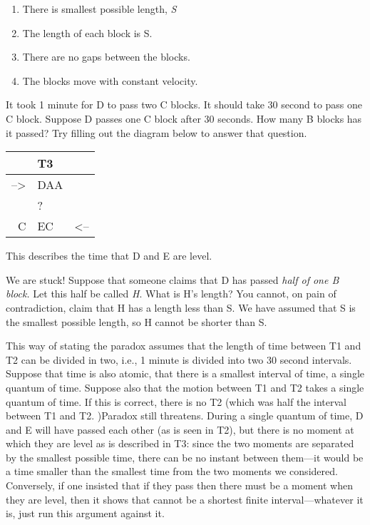 \documentclass[]{article}
\providecommand{\tightlist}{%
  \setlength{\itemsep}{0pt}\setlength{\parskip}{0pt}}
\begin{document}
\begin{enumerate}
\def\labelenumi{\arabic{enumi}.}
\tightlist
\item
  There is smallest possible length, \emph{S}
\item
  The length of each block is S.
\item
  There are no gaps between the blocks.
\item
  The blocks move with constant velocity.
\end{enumerate}

It took 1 minute for D to pass two C blocks. It should take 30 second to
pass one C block. Suppose D passes one C block after 30 seconds. How
many B blocks has it passed? Try filling out the diagram below to answer
that question.

\begin{longtable}[c]{@{}rll@{}}
\toprule
& T3 &\tabularnewline
\midrule
\endhead
--\textgreater{} & DAA &\tabularnewline
& ? &\tabularnewline
C & EC~ & \textless{}--\tabularnewline
\bottomrule
\end{longtable}

This describes the time that D and E are level.

We are stuck! Suppose that someone claims that D has passed \emph{half
of one B block.} Let this half be called \emph{H}. What is H's length?
You cannot, on pain of contradiction, claim that H has a length less
than S. We have assumed that S is the smallest possible length, so H
cannot be shorter than S.

This way of stating the paradox assumes that the length of time between
T1 and T2 can be divided in two, i.e., 1 minute is divided into two 30
second intervals. Suppose that time is also atomic, that there is a
smallest interval of time, a single quantum of time. Suppose also that
the motion between T1 and T2 takes a single quantum of time. If this is
correct, there is no T2 (which was half the interval between T1 and T2.
)Paradox still threatens. During a single quantum of time, D and E will
have passed each other (as is seen in T2), but there is no moment at
which they are level as is described in T3: since the two moments are
separated by the smallest possible time, there can be no instant between
them---it would be a time smaller than the smallest time from the two
moments we considered. Conversely, if one insisted that if they pass
then there must be a moment when they are level, then it shows that
cannot be a shortest finite interval---whatever it is, just run this
argument against it.
\end{document}
